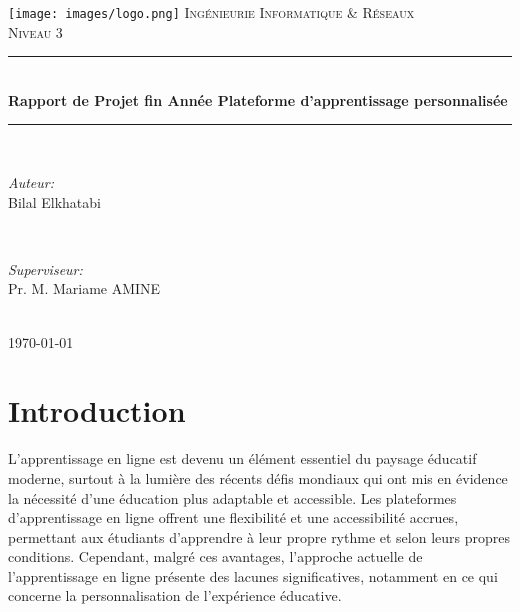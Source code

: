 




\pagestyle{fancy}
\fancyhf{}

\begin{titlepage}
\newcommand{\HRule}{\rule{\linewidth}{0.5mm}}
\centering
\texttt{[image: images/logo.png]} 
\vfill
\textsc{\LARGE Ingénieurie Informatique \& Réseaux}\\[0.5cm]  
\textsc{\Large Niveau 3}\\[0.5cm] 
\HRule \\[0.4cm]
{ \huge \bfseries Rapport de Projet fin Année  Plateforme d'apprentissage personnalisée}
\HRule \\[1.5cm]

\begin{minipage}{0.4\textwidth}
\begin{flushleft} \large
\emph{Auteur:}\\
Bilal Elkhatabi
\end{flushleft}
\end{minipage}
~
\begin{minipage}{0.4\textwidth}
\begin{flushright} \large
\emph{Superviseur:} \\
Pr. M. Mariame AMINE
\end{flushright}
\end{minipage}\\[2cm]

{\large \today}\\[2cm] 
\nopagebreak
\end{titlepage}

\tableofcontents
\newpage


\part{Introduction}

L'apprentissage en ligne est devenu un élément essentiel du paysage éducatif moderne, surtout à la lumière des récents défis mondiaux qui ont mis en évidence la nécessité d'une éducation plus adaptable et accessible. Les plateformes d'apprentissage en ligne offrent une flexibilité et une accessibilité accrues, permettant aux étudiants d'apprendre à leur propre rythme et selon leurs propres conditions. Cependant, malgré ces avantages, l'approche actuelle de l'apprentissage en ligne présente des lacunes significatives, notamment en ce qui concerne la personnalisation de l'expérience éducative.

